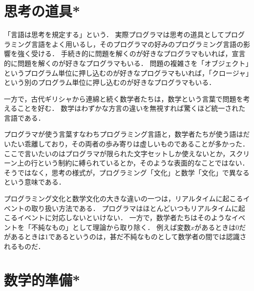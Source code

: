 \documentclass[twocolumn]{jsbook}
\newcommand{\mathidentity}{\mathcal{O}}
\begin{document}
\newcommand{\haskellkeyword}[1]{\textbf{#1}}
\newcommand{\letinprogram}{\haskellkeyword{let}}
\newcommand{\otherwise}{\haskellkeyword{otherwise}}
\newcommand{\where}{\haskellkeyword{where}}

\newcommand{\mathkeyword}[1]{\textbf{#1}}
\newcommand{\mathelse}{\mathop{\mathkeyword{else}}}
\newcommand{\mathif}{\mathop{\mathkeyword{if}}}
\newcommand{\maththen}{\mathop{\mathkeyword{then}}}

\newcommand{\specialkeyword}[1]{\textsf{#1}}
\newcommand{\firstelem}{\specialkeyword{First}}
\newcommand{\mathidentity}{\specialkeyword{id}}
\newcommand{\nothing}{\specialkeyword{Nothing}}
\newcommand{\restelems}{\specialkeyword{Rest}}

\chapter{思考の道具*}

「言語は思考を規定する」という．
実際プログラマは思考の道具としてプログラミング言語をよく用いるし，そのプログラマの好みのプログラミング言語の影響を強く受ける．
手続き的に問題を解くのが好きなプログラマもいれば，宣言的に問題を解くのが好きなプログラマもいる．
問題の複雑さを「オブジェクト」というプログラム単位に押し込むのが好きなプログラマもいれば，「クロージャ」という別のプログラム単位に押し込むのが好きなプログラマもいる．

一方で，古代ギリシャから連綿と続く数学者たちは，数学という言葉で問題を考えることを好む．
数学はわずかな方言の違いを無視すれば驚くほど統一された言語である．

プログラマが使う言葉すなわちプログラミング言語と，数学者たちが使う語はだいたい乖離しており，その両者の歩み寄りは虚しいものであることが多かった．
ここで言いたいのはプログラマが限られた文字セットしか使えないとか，スクリーン上の行という制約に縛られているとか，そのような表面的なことではない．
そうではなく，思考の様式が，プログラミング「文化」と数学「文化」で異なるという意味である．

プログラミング文化と数学文化の大きな違いの一つは，リアルタイムに起こるイベントの取り扱い方法である．
プログラマはほとんどいつもリアルタイムに起こるイベントに対応しないといけない．
一方で，数学者たちはそのようなイベントを「不純なもの」として理論から取り除く．
例えば変数$x$があるときは$0$だがあるときは$1$であるというのは，甚だ不純なものとして数学者の間では認識されるものだ．

\chapter{数学的準備*}
\end{document}
